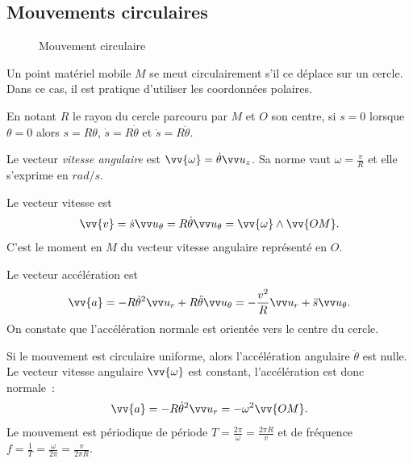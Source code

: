 \subsection{Mouvements circulaires}
\label{chap1-subsec:mvtcirc}

 \begin{figure}
   \centering
   \caption{Mouvement circulaire}
   \label{fig:mvt-circulaire}
 \end{figure}

Un point matériel mobile $M$ se meut circulairement s'il ce déplace sur un cercle. Dans ce cas, il est pratique d'utiliser les coordonnées polaires.

En notant $R$ le rayon du cercle parcouru par $M$ et $O$ son centre, si $s=0$ lorsque $\theta=0$ alors $s=R\theta$, $\dot{s}=R\dot{\theta}$ et $\ddot{s}=R\ddot{\theta}$.

Le vecteur \emph{vitesse angulaire} est $\vv{\omega}=\dot{\theta}\uz$. Sa norme vaut $\omega=\frac{v}{R}$ et elle s'exprime en $\si{rad\per s}$. 

Le vecteur vitesse est 
\begin{equation}
 \vv{v}=\dot{s}\utheta=R\dot{\theta} \utheta= \vv{\omega} \wedge \vv{OM}.
\end{equation}
C'est le moment en $M$ du vecteur vitesse angulaire représenté en $O$.

Le vecteur accélération est
\begin{equation}
\vv{a}=-R\dot{\theta}^2\ur +R\ddot{\theta}\utheta=-\frac{v^2}{R}\ur+\ddot{s}\utheta.  
\end{equation}
On constate que l'accélération normale est orientée vers le centre du cercle.

Si le mouvement est circulaire uniforme, alors l'accélération angulaire $\ddot{\theta}$ est nulle. Le vecteur vitesse angulaire $\vv{\omega}$ est constant, l'accélération est donc normale~:
\begin{equation}
  \vv{a}=-R\dot{\theta}^2\ur =-\omega^2\vv{OM}.
\end{equation}
Le mouvement est périodique de période $T=\frac{2\pi}{\omega}=\frac{2\pi R}{v}$ et de fréquence $f=\frac{1}{T}=\frac{\omega}{2\pi}=\frac{v}{2\pi R}$.

